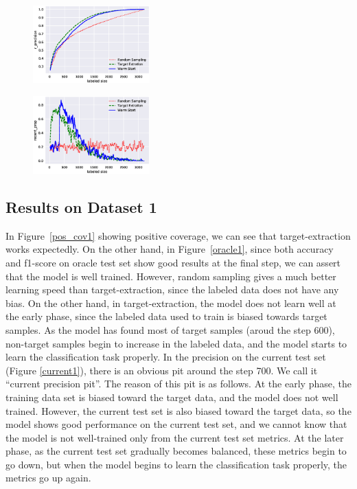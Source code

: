 \documentclass{deime}
\begin{document}
\begin{figure}[!t]
\includegraphics[width=0.4\textwidth]{resource/imdb/r_precision}
\label{rprecision2}
\end{figure}

\begin{figure}[!t]
\includegraphics[width=0.4\textwidth]{resource/imdb/recent_prop}
\label{recent2}
\end{figure}

\subsection{Results on Dataset 1}

In Figure~\ref{pos_cov1} showing positive coverage, we can see that
target-extraction works expectedly. On the other hand, in
Figure~\ref{oracle1}, since both accuracy and f1-score on oracle test
set show good results at the final step, we can assert that the model
is well trained. However, random sampling gives a much better learning
speed than target-extraction, since the labeled data does not have any
bias. On the other hand, in target-extraction, the model does not
learn well at the early phase, since the labeled data used to train is
biased towards target samples. As the model has found most of target
samples (aroud the step 600), non-target samples begin to increase in
the labeled data, and the model starts to learn the classification
task properly.  In the precision on the current test set (Figure
\ref{current1}), there is an obvious pit around the step 700. We call
it ``current precision pit''.  The reason of this pit is as follows.
At the early phase, the training data set is biased toward the target
data, and the model does not well trained.  However, the current test
set is also biased toward the target data, so the model shows good
performance on the current test set, and we cannot know that the model
is not well-trained only from the current test set metrics. At the
later phase, as the current test set gradually becomes balanced, these
metrics begin to go down, but when the model begins to learn the
classification task properly, the metrics go up again.
\end{document}
